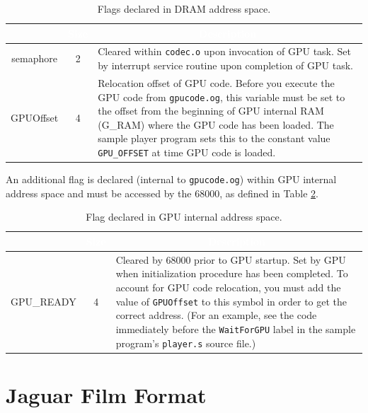 \documentclass[12pt,letterpaper,twoside]{article}
\newcommand{\tabheadtxt}[1]{\multicolumn{1}{c}{\textcolor{white}{\textbf{#1}}}}
\begin{document}
\begin{table}[h]
\centering
\begin{tabular}{|c|c|p{12cm}|}
\hline
\rowcolor{black}
\tabheadtxt{Flag} & \tabheadtxt{Size} & \tabheadtxt{Description} \\
\hline
semaphore & 2 & Cleared within \texttt{codec.o} upon invocation of GPU task. Set by interrupt service routine upon completion of GPU task. \\
\hline
GPUOffset & 4 & Relocation offset of GPU code. Before you execute the GPU code from \texttt{gpucode.og}, this variable must be set to the offset from the beginning of GPU internal RAM (G\_RAM) where the GPU code has been loaded.\newline
\newline
The sample player program sets this to the constant value \texttt{GPU\_OFFSET} at time GPU code is loaded.\\
\hline
\end{tabular}
\caption{Flags declared in DRAM address space.}
\label{tab:dramflags}
\end{table}
\FloatBarrier

An additional flag is declared (internal to \texttt{gpucode.og}) within GPU internal address space and must be accessed by the 68000, as defined in Table \ref{tab:gpuflags}.

\begin{table}[h]
\centering
\begin{tabular}{|c|c|p{11cm}|}
\hline
\rowcolor{black}
\tabheadtxt{Flag} & \tabheadtxt{Size} & \tabheadtxt{Description} \\
\hline
GPU\_READY & 4 & Cleared by 68000 prior to GPU startup. Set by GPU when initialization procedure has been completed.\newline
\newline
To account for GPU code relocation, you must add the value of \texttt{GPUOffset} to this symbol in order to get the correct address. (For an example, see the code immediately before the \texttt{WaitForGPU} label in the sample program's \texttt{player.s} source file.) \\
\hline
\end{tabular}
\caption{Flag declared in GPU internal address space.}
\label{tab:gpuflags}
\end{table}
\FloatBarrier

\section{Jaguar Film Format}
\end{document}
